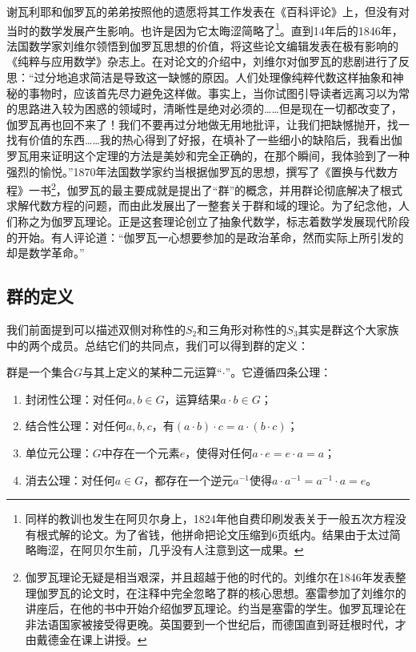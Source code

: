 \documentclass[b5paper]{ctexart}
\begin{document}
谢瓦利耶和伽罗瓦的弟弟按照他的遗愿将其工作发表在《百科评论》上，但没有对当时的数学发展产生影响。也许是因为它太晦涩简略了\footnote{同样的教训也发生在阿贝尔身上，1824年他自费印刷发表关于一般五次方程没有根式解的论文。为了省钱，他拼命把论文压缩到6页纸内。结果由于太过简略晦涩，在阿贝尔生前，几乎没有人注意到这一成果。}。直到14年后的1846年，法国数学家刘维尔领悟到伽罗瓦思想的价值，将这些论文编辑发表在极有影响的《纯粹与应用数学》杂志上。在对论文的介绍中，刘维尔对伽罗瓦的悲剧进行了反思：“过分地追求简洁是导致这一缺憾的原因。人们处理像纯粹代数这样抽象和神秘的事物时，应该首先尽力避免这样做。事实上，当你试图引导读者远离习以为常的思路进入较为困惑的领域时，清晰性是绝对必须的……但是现在一切都改变了，伽罗瓦再也回不来了！我们不要再过分地做无用地批评，让我们把缺憾抛开，找一找有价值的东西……我的热心得到了好报，在填补了一些细小的缺陷后，我看出伽罗瓦用来证明这个定理的方法是美妙和完全正确的，在那个瞬间，我体验到了一种强烈的愉悦。”1870年法国数学家约当根据伽罗瓦的思想，撰写了《置换与代数方程》一书\footnote{伽罗瓦理论无疑是相当艰深，并且超越于他的时代的。刘维尔在1846年发表整理伽罗瓦的论文时，在注释中完全忽略了群的核心思想。塞雷参加了刘维尔的讲座后，在他的书中开始介绍伽罗瓦理论。约当是塞雷的学生。伽罗瓦理论在非法语国家被接受得更晚。英国要到一个世纪后，而德国直到哥廷根时代，才由戴德金在课上讲授。}，伽罗瓦的最主要成就是提出了“群”的概念，并用群论彻底解决了根式求解代数方程的问题，而由此发展出了一整套关于群和域的理论。为了纪念他，人们称之为伽罗瓦理论。正是这套理论创立了抽象代数学，标志着数学发展现代阶段的开始。有人评论道：“伽罗瓦一心想要参加的是政治革命，然而实际上所引发的却是数学革命。\cite{StepanovRose15}”

\subsection{群的定义}

我们前面提到可以描述双侧对称性的$S_2$和三角形对称性的$S_3$其实是群这个大家族中的两个成员。总结它们的共同点，我们可以得到群的定义：

\begin{definition}群是一个集合$G$与其上定义的某种二元运算“$\cdot$”。它遵循四条公理：
\begin{enumerate}
\item 封闭性公理：对任何$a, b \in G$，运算结果$a \cdot b \in G$；
\item 结合性公理：对任何$a, b, c$，有$(a \cdot b) \cdot c = a \cdot (b \cdot c)$；
\item 单位元公理：$G$中存在一个元素$e$，使得对任何$a \cdot e = e \cdot a = a$；
\item 消去公理：对任何$a \in G$，都存在一个逆元$a^{-1}$使得$a \cdot a^{-1} = a^{-1} \cdot a = e$。
\end{enumerate}
\end{definition}
\end{document}
